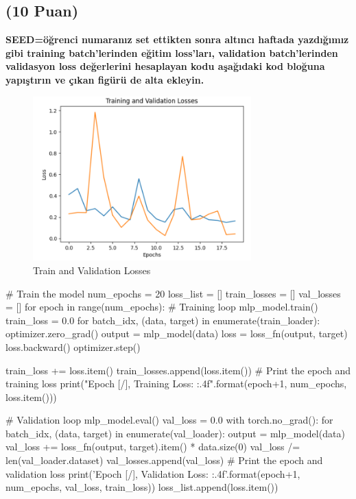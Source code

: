 \documentclass[11pt]{article}
\begin{document}
\subsection{(10 Puan)} \textbf{SEED=öğrenci numaranız set ettikten sonra altıncı haftada yazdığımız gibi training batch'lerinden eğitim loss'ları, validation batch'lerinden validasyon loss değerlerini hesaplayan kodu aşağıdaki kod bloğuna yapıştırın ve çıkan figürü de alta ekleyin.}

\begin{figure}[ht!]
    \centering
    \includegraphics[width=0.75\textwidth]{losses.PNG}
    \caption{Train and Validation Losses}
    \label{fig:my_pic}
\end{figure}


\begin{python}
# Train the model
num_epochs = 20
loss_list = []
train_losses = []
val_losses = []
for epoch in range(num_epochs):
    # Training loop
    mlp_model.train()
    train_loss = 0.0
    for batch_idx, (data, target) in enumerate(train_loader):
        optimizer.zero_grad()
        output = mlp_model(data)
        loss = loss_fn(output, target)
        loss.backward()
        optimizer.step()
        
        train_loss += loss.item()
    train_losses.append(loss.item())
    # Print the epoch and training loss
    print("Epoch [{}/{}], Training Loss: {:.4f}".format(epoch+1, num_epochs, loss.item()))
    
    # Validation loop
    mlp_model.eval()
    val_loss = 0.0
    with torch.no_grad():
        for batch_idx, (data, target) in enumerate(val_loader):
            output = mlp_model(data)
            val_loss += loss_fn(output, target).item() * data.size(0)
    val_loss /= len(val_loader.dataset)
    val_losses.append(val_loss)
    # Print the epoch and validation loss
    print('Epoch [{}/{}], Validation Loss: {:.4f}'.format(epoch+1, num_epochs, val_loss, train_loss))
    loss_list.append(loss.item())
\end{python}
\end{document}
